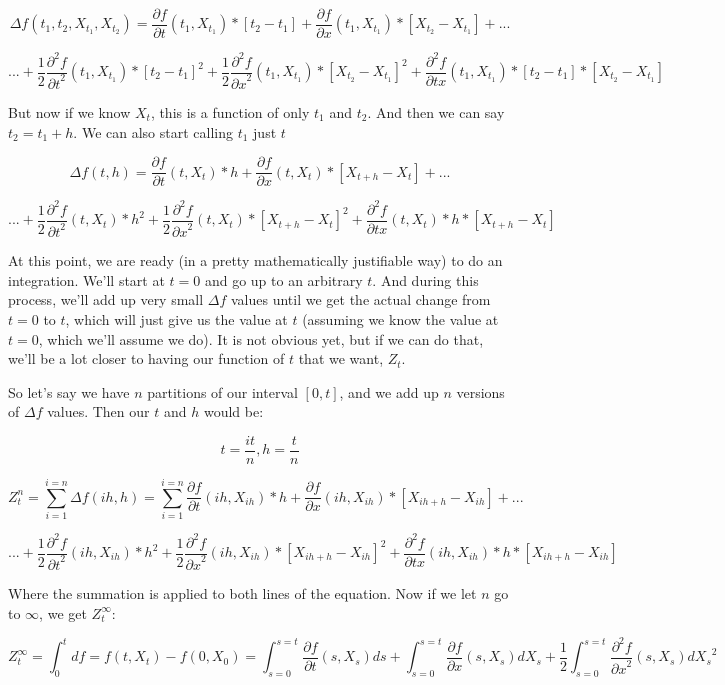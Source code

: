 \documentclass{article}
\begin{document}
$$\Delta f(t_1,t_2,X_{t_1},X_{t_2}) = \frac{\partial f}{\partial t}(t_1,X_{t_1}) *[t_2-t_1] + \frac{\partial f}{\partial x}(t_1,X_{t_1}) *[X_{t_2}-X_{t_1}]  + ... $$

$$... +  \frac{1}{2}\frac{\partial^2 f}{{\partial t}^2}(t_1,X_{t_1}) * {[t_2-t_1]}^2 + \frac{1}{2}\frac{\partial^2 f}{{\partial x}^2}(t_1,X_{t_1}) * {[X_{t_2}-X_{t_1}]}^2 +  \frac{\partial^2 f}{\partial tx}(t_1,X_{t_1}) *[t_2-t_1]*[X_{t_2}-X_{t_1}]$$

But now if we know $X_t$, this is a function of only $t_1$ and $t_2$.  And then we can say $t_2 = t_1 + h$. We can also start calling $t_1$ just $t$

$$\Delta f(t,h) = \frac{\partial f}{\partial t}(t,X_{t}) *h + \frac{\partial f}{\partial x}(t,X_{t}) *[X_{t+h}-X_{t}]  + ... $$

$$... +  \frac{1}{2}\frac{\partial^2 f}{{\partial t}^2}(t,X_{t}) * {h}^2 + \frac{1}{2}\frac{\partial^2 f}{{\partial x}^2}(t,X_{t}) * {[X_{t+h}-X_{t}]}^2 +  \frac{\partial^2 f}{\partial tx}(t,X_{t}) *h*[X_{t+h}-X_{t}]$$

At this point, we are ready (in a pretty mathematically justifiable way) to do an integration. We'll start at $t=0$ and go up to an arbitrary $t$.  And during this process, we'll add up very small $\Delta f$ values until we get the actual change from $t=0$ to $t$, which will just give us the value at $t$ (assuming we know the value at $t=0$, which we'll assume we do).  It is not obvious yet, but if we can do that, we'll be a lot closer to having our function of $t$ that we want, $Z_t$. 

So let's say we have $n$ partitions of our interval $[0,t]$, and we add up $n$ versions of $\Delta f$ values.  Then our $t$ and $h$ would be:

$$t = \frac{it}{n}, h = \frac{t}{n}$$

$$Z_t^n = \sum_{i=1}^{i = n} \Delta f\left(ih,h\right) = \sum_{i=1}^{i = n} \frac{\partial f}{\partial t}(ih,X_{ih}) *h + \frac{\partial f}{\partial x}(ih,X_{ih}) *[X_{ih+h}-X_{ih}]  + ... $$

$$... +  \frac{1}{2}\frac{\partial^2 f}{{\partial t}^2}(ih,X_{ih}) * {h}^2 + \frac{1}{2}\frac{\partial^2 f}{{\partial x}^2}(ih,X_{ih}) * {[X_{ih+h}-X_{ih}]}^2 +  \frac{\partial^2 f}{\partial tx}(ih,X_{ih}) *h*[X_{ih+h}-X_{ih}]$$

Where the summation is applied to both lines of the equation.  Now if we let $n$ go to $\infty$, we get $Z_t^{\infty}$:

$$Z_t^{\infty} = \int_{0}^{t}df = f(t,X_t) - f(0,X_0) = \int_{s=0}^{s=t} \frac{\partial f}{\partial t}(s,X_{s}) ds + \int_{s=0}^{s=t}\frac{\partial f}{\partial x}(s,X_s) dX_s  + \frac{1}{2}\int_{s=0}^{s=t}\frac{\partial^2 f}{{\partial x}^2}(s,X_s)  {dX_s}^2 $$
\end{document}
